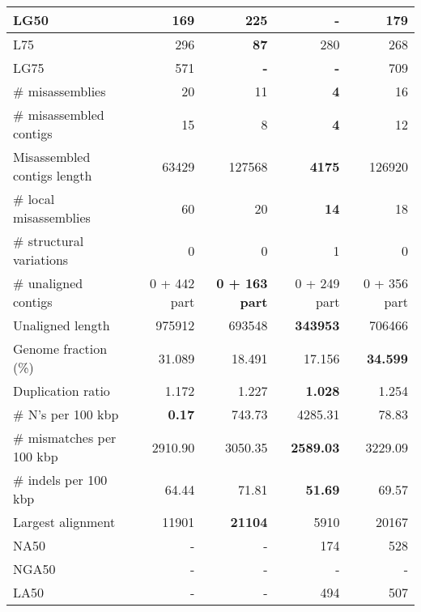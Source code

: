\documentclass[12pt,a4paper]{article}
\begin{document}
\begin{table}[ht]
\begin{center}
\begin{tabular}{|l*{4}{|r}|}
LG50 & 169 & 225 & {\bf -} & 179 \\ \hline
L75 & 296 & {\bf 87} & 280 & 268 \\ \hline
LG75 & 571 & {\bf -} & {\bf -} & 709 \\ \hline
\# misassemblies & 20 & 11 & {\bf 4} & 16 \\ \hline
\# misassembled contigs & 15 & 8 & {\bf 4} & 12 \\ \hline
Misassembled contigs length & 63429 & 127568 & {\bf 4175} & 126920 \\ \hline
\# local misassemblies & 60 & 20 & {\bf 14} & 18 \\ \hline
\# structural variations & 0 & 0 & 1 & 0 \\ \hline
\# unaligned contigs & 0 + 442 part & {\bf 0 + 163 part} & 0 + 249 part & 0 + 356 part \\ \hline
Unaligned length & 975912 & 693548 & {\bf 343953} & 706466 \\ \hline
Genome fraction (\%) & 31.089 & 18.491 & 17.156 & {\bf 34.599} \\ \hline
Duplication ratio & 1.172 & 1.227 & {\bf 1.028} & 1.254 \\ \hline
\# N's per 100 kbp & {\bf 0.17} & 743.73 & 4285.31 & 78.83 \\ \hline
\# mismatches per 100 kbp & 2910.90 & 3050.35 & {\bf 2589.03} & 3229.09 \\ \hline
\# indels per 100 kbp & 64.44 & 71.81 & {\bf 51.69} & 69.57 \\ \hline
Largest alignment & 11901 & {\bf 21104} & 5910 & 20167 \\ \hline
NA50 & - & - & 174 & 528 \\ \hline
NGA50 & - & - & - & - \\ \hline
LA50 & - & - & 494 & 507 \\ \hline
\end{tabular}
\end{center}
\end{table}
\end{document}
